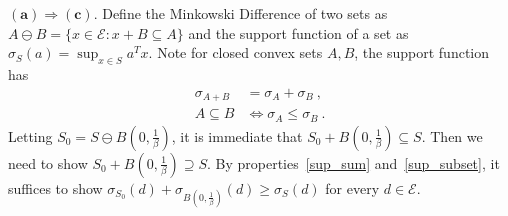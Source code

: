 \documentclass[sn-mathphys,Numbered]{sn-jnl}%
\begin{document}
\begin{appendices}
{%


\noindent $\mathbf{(a) \Rightarrow (c)}$.
Define the Minkowski Difference of two sets as $A \ominus B=\{x \in \mathcal{E}: x+B \subseteq A\}$ and the support function of a set as $\sigma_S(a)=\sup _{x \in S} a^Tx$. Note for closed convex sets $A,B$, the support function has
\begin{align} 
\sigma_{A+B} &= \sigma_{A}+\sigma_{B}\ , \label{sup_sum}\\
A \subseteq B &\Longleftrightarrow \sigma_A \leq \sigma_{B}\ . \label{sup_subset}
\end{align}
Letting $S_0=S \ominus B(0, \frac{1}{\beta})$, it is immediate that $S_0+B(0,\frac{1}{\beta}) \subseteq S$. Then we need to show $S_0+B(0,\frac{1}{\beta}) \supseteq S$. By properties~\eqref{sup_sum} and~\eqref{sup_subset}, it suffices to show $\sigma_{S_0}(d)+\sigma_{B(0,\frac{1}{\beta})}(d) \geq \sigma_{S}(d)$ for every $d \in \mathcal{E}$.

}
\end{appendices}
\end{document}
